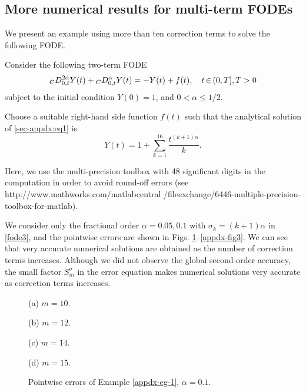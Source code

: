 \documentclass[10pt]{siamltex}
\begin{document}
\subsection{More numerical results for multi-term FODEs}
We present an example using more than ten correction terms to solve the following FODE.
\begin{example}\label{appdx-eg-1}
Consider the following two-term FODE
\begin{equation}\label{sec-appdx:eq1}
{}_{C}D^{2\alpha}_{0,t}Y(t)+{}_{C}D^{\alpha}_{0,t}Y(t)=-Y(t)+f(t),{\quad}t{\,\in\,}
 {(0,T],T>0}\\
\end{equation}
subject to the initial condition $Y(0)=1$,   and $0<\alpha\leq1/2$.
\end{example}
Choose a suitable right-hand side function $f(t)$ such that
the analytical solution of \eqref{sec-appdx:eq1} is
$$Y(t)=1+\sum_{k=1}^{16}\frac{t^{(k+1)\alpha}}{k}.$$

Here, we use the multi-precision toolbox  with 48 significant digits in the computation in order to avoid round-off errors (see http://www.mathworks.com/matlabcentral
/fileexchange/6446-multiple-precision-toolbox-for-matlab).

We consider only the fractional order $\alpha=0.05,0.1$ with $\sigma_k=(k+1)\alpha$ in \eqref{fode3}, and the pointwise errors are shown in Figs. \ref{appdx-fig2}--\ref{appdx-fig3}. We can see that very accurate numerical solutions are obtained as the number of correction terms increases. Although we did not observe the global second-order accuracy, the small factor $S_m^{\sigma}$ in the error equation makes numerical solutions very accurate as correction terms increases.

\begin{figure}[!t]
\begin{center}
\begin{minipage}{0.45\textwidth}\centering
{}   \par{(a)  $m=10$.}
\end{minipage}
\begin{minipage}{0.45\textwidth}\centering
{}  \par{(b)   $m=12$.}
\end{minipage}
\begin{minipage}{0.45\textwidth}\centering
{}   \par{(c) $m=14$.}
\end{minipage}
\begin{minipage}{0.45\textwidth}\centering
{}   \par{(d) $m=15$.}
\end{minipage}
\end{center}
\caption{Pointwise errors of Example \ref{appdx-eg-1},  $\alpha=0.1$.\label{appdx-fig2}}
\end{figure}
\end{document}

